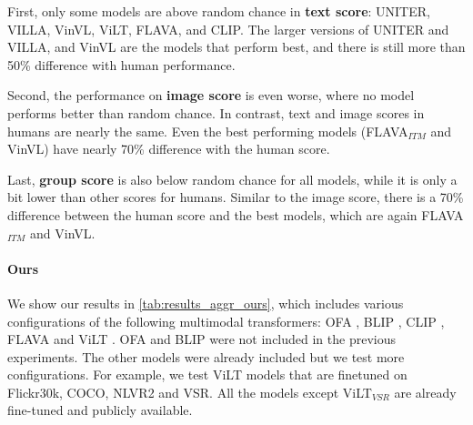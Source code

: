 First, only some models are above random chance in \textbf{text score}: UNITER, VILLA, VinVL, ViLT, FLAVA, and CLIP. The larger versions of UNITER and VILLA, and VinVL are the models that perform best, and there is still more than 50\% difference with human performance.

Second, the performance on \textbf{image score} is even worse, where no model performs better than random chance. In contrast, text and image scores in humans are nearly the same. Even the best performing models (FLAVA$_{ITM}$ and VinVL) have nearly 70\% difference with the human score.

Last, \textbf{group score} is also below random chance for all models, while it is only a bit lower than other scores for humans. Similar to the image score, there is a 70\% difference between the human score and the best models, which are again FLAVA$_{ITM}$ and VinVL.

\paragraph{Ours}
We show our results in \cref{tab:results_aggr_ours}, which includes various configurations of the following multimodal transformers: OFA \cite{wang2022unifying}, BLIP \cite{li2022blip}, CLIP \cite{radford2021clip}, FLAVA \cite{singh2022flava} and ViLT \cite{kim2021vilt}. OFA and BLIP were not included in the previous experiments. The other models were already included but we test more configurations. For example, we test ViLT models that are finetuned on Flickr30k, COCO, NLVR2 and VSR. All the models except ViLT$_{VSR}$ are already fine-tuned and publicly available.

